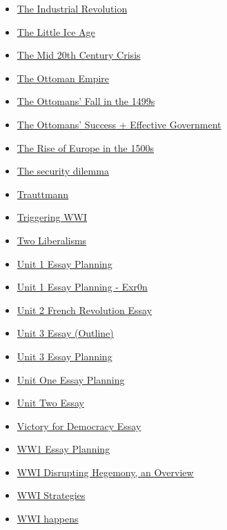 \documentclass[11pt]{article}
\begin{document}
\begin{itemize}
\begin{itemize}
\item \href{hist201/KBhHIST201IndustrialRevolution.org}{The Industrial Revolution}
\item \href{hist201/KBhHIST201LittleIceAge.org}{The Little Ice Age}
\item \href{hist201/KBhHIST201ColdWar.org}{The Mid 20th Century Crisis}
\item \href{hist201/KBrefOttomanEmpire.org}{The Ottoman Empire}
\item \href{hist201/KBhHIST201OttomansFall1500s.org}{The Ottomans' Fall in the 1499s}
\item \href{hist201/KBhHIST201OttomansSuccess.org}{The Ottomans' Success + Effective Government}
\item \href{hist201/KBhHIST201RiseOfEurope1500.org}{The Rise of Europe in the 1500s}
\item \href{hist201/KBrefSecurityDilemma.org}{The security dilemma}
\item \href{hist201/KBhHIST201Trauttmann.org}{Trauttmann}
\item \href{hist201/KBhHIST201WWITriggering.org}{Triggering WWI}
\item \href{hist201/KBhHIST201Liberalism.org}{Two Liberalisms}
\item \href{hist201/KBhHIST201Unit1EssayJack.org}{Unit 1 Essay Planning}
\item \href{hist201/KBe20hist201Unit1Essay.org}{Unit 1 Essay Planning - Exr0n}
\item \href{hist201/KBhHIST201Unit2EssayJack.org}{Unit 2 French Revolution Essay}
\item \href{hist201/KBhHIST201Unit3EssayOutlineForSushuJack.org}{Unit 3 Essay (Outline)}
\item \href{hist201/KBxUnit3EssayPlanning.org}{Unit 3 Essay Planning}
\item \href{hist201/KBxUnitOneEssayPlanning.org}{Unit One Essay Planning}
\item \href{hist201/KBUnitTwoEssayHux.org}{Unit Two Essay}
\item \href{hist201/KBe21hist201retVictoryForDemocracy.org}{Victory for Democracy Essay}
\item \href{hist201/KBxWW1EssayPlanning.org}{WW1 Essay Planning}
\item \href{hist201/KBhHIST201WWI.org}{WWI Disrupting Hegemony, an Overview}
\item \href{hist201/KBhHIST201WWIStrategies.org}{WWI Strategies}
\item \href{hist201/KBe21hist201floWWIPlaysOut.org}{WWI happens}

\end{itemize}
\end{itemize}
\end{document}
